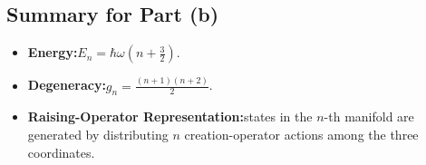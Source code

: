 \documentclass[12pt]{article}
\begin{document}
\subsection*{Summary for Part (b)}
\begin{itemize}
  \item \textbf{Energy:}\quad \(E_n = \hbar \omega (n + \tfrac{3}{2})\).
  \item \textbf{Degeneracy:}\quad \(g_n = \frac{(n+1)(n+2)}{2}\).
  \item \textbf{Raising-Operator Representation:}\quad states in the \(n\)-th manifold are generated by distributing \(n\) creation-operator actions among the three coordinates.
\end{itemize}
\end{document}
